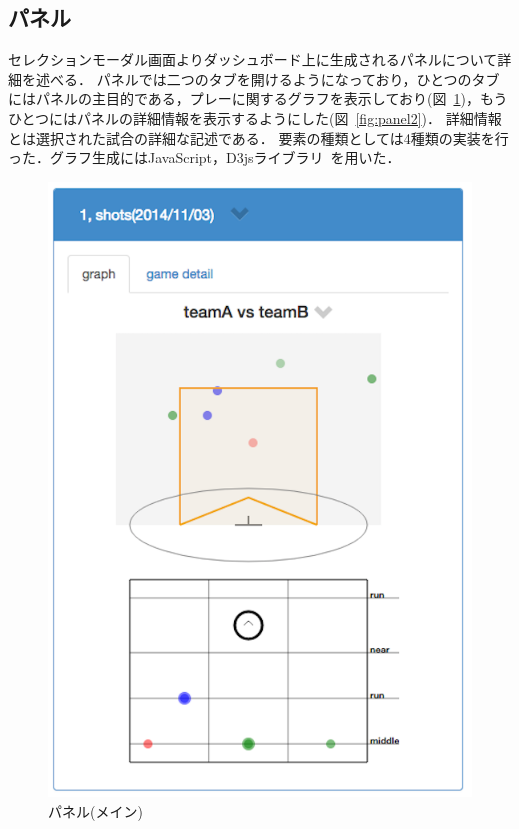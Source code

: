 \documentclass[sotsuron]{kuee}
\begin{document}
		\subsection{パネル}
			セレクションモーダル画面よりダッシュボード上に生成されるパネルについて詳細を述べる．
			パネルでは二つのタブを開けるようになっており，ひとつのタブにはパネルの主目的である，プレーに関するグラフを表示しており(図~\ref{fig:panel1})，もうひとつにはパネルの詳細情報を表示するようにした(図~\ref{fig:panel2})．
			詳細情報とは選択された試合の詳細な記述である．
			要素の種類としては4種類の実装を行った．グラフ生成にはJavaScript，D3jsライブラリ~\cite{D3}を用いた．
				\begin{figure}
					\begin{center}
						\includegraphics[width=\linewidth]{./png/panel1.png}
					\end{center}
					\caption{パネル(メイン)}
			  		\label{fig:panel1}
				\end{figure}
\end{document}
